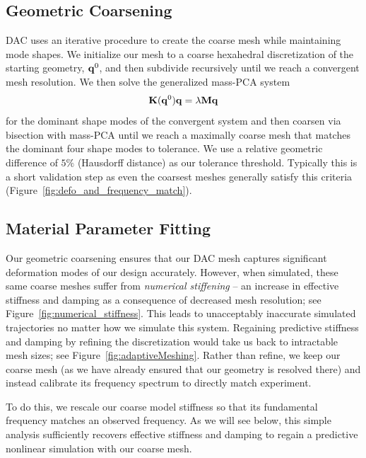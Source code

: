 \subsection{Geometric Coarsening}
DAC uses an iterative procedure {to create the} coarse mesh while maintaining mode shapes. We initialize our mesh to a coarse hexahedral discretization of the starting geometry, $\mathbf {q}^0$, and then subdivide recursively until we reach a convergent mesh resolution. We then solve the generalized mass-PCA system 
\begin{align}
\mathbf {K}(\mathbf {q}^0) \mathbf {q} = \lambda \mathbf {M} \mathbf {q}
\end{align}
for the dominant shape modes of the convergent system and then coarsen via bisection 
with mass-PCA until we reach a maximally coarse mesh that matches the dominant four shape modes to tolerance. We use a relative geometric difference of $5\%$ (Hausdorff distance) as our tolerance threshold. Typically this is a short validation step as even the coarsest meshes generally satisfy this criteria (Figure~\ref{fig:defo_and_frequency_match}).

\subsection{Material Parameter Fitting}  
Our geometric coarsening ensures that our DAC mesh captures significant deformation modes of our design accurately. However, when simulated, these same coarse meshes suffer from \emph{numerical stiffening} -- an increase in effective stiffness and damping as a consequence of decreased mesh resolution; see Figure~\ref{fig:numerical_stiffness}. This leads to unacceptably inaccurate simulated trajectories no matter how we simulate this system. Regaining predictive stiffness and damping by refining the discretization would take us back to intractable mesh sizes; see Figure~\ref{fig:adaptiveMeshing}.
Rather than refine, we keep our coarse mesh (as we have already ensured that our geometry is resolved there) and instead calibrate its frequency spectrum to directly match experiment. 

To do this, we rescale our coarse model stiffness so that its fundamental frequency matches an observed frequency. As we will see below, this simple analysis sufficiently recovers effective stiffness and damping to regain a predictive 
nonlinear simulation with our coarse mesh. 

